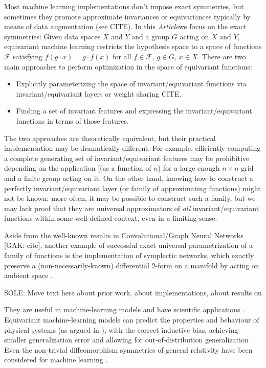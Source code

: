 \documentclass{article}
\theoremstyle{plain}
\theoremstyle{definition}
\theoremstyle{remark}
\newcommand{\documentname}{\textsl{Article}}
\begin{document}
Most machine learning implementations don't impose exact symmetries, but sometimes they promote approximate invariances or equivariances typically by means of data augmentation (see CITE). In this \documentname we focus on the exact symmetries: Given data spaces $X$ and $Y$ and a group $G$ acting on $X$ and $Y$, equivariant machine learning restricts the hypothesis space to a space of functions $\mathcal F$ satisfying  $f(g\cdot x) = g \cdot f(x)$ for all $f\in \mathcal F$, $g\in G$, $x\in X$. There are two main approaches to perform optimization in the space of equivariant functions:
\begin{itemize}
    \item Explicitly parameterizing the space of invariant/equivariant functions via invariant/equivariant layers or weight sharing CITE.
    \item Finding a set of invariant features and expressing the invariant/equivariant functions in terms of those features.
\end{itemize}

The two approaches are theoretically equivalent, but their practical implementation may be dramatically different. For example, efficiently computing a complete generating set of invariant/equivariant features may be prohibitive depending on the application [(as a function of $n$) for a large enough $n\times n$ grid  and a finite group acting on it. On the other hand, knowing how to construct a perfectly invariant/equivariant layer (or family of approximating functions) might not be known; more often, it may be possible to construct such a family, but we may lack proof that they are universal approximators of \textit{all} invariant/equivariant functions within some well-defined context, even in a limiting sense.

Aside from the well-known results in Convolutional/Graph Neural Networks [GAK: cite], another example of successful exact universal parametrization of a family of functions is the implementation of symplectic networks, which exactly preserve a (non-necessarily-known) differential 2-form on a manifold by acting on ambient space \cite{sympnets,henonnets}.

SOLE: Move text here about prior work, about implementations, about results on 

They are useful in machine-learning models \cite{cohen2016group, kondor2018convolution, thomas2018tensor, geiger2022e3nn, finzi2020generalizing, finzi2021practical} and have scientific applications \cite{batzner20223, musaelian2022learning, stark2022equibind, yu-physics, wang2022approximately}.
Equivariant machine-learning models can predict the properties and behaviour of physical systems (as argued in \citealt{cheng2019covariance}), with the correct inductive bias, achieving smaller generalization error \cite{bietti2021sample, elesedy2021provably, elesedy2021kernel, mei2021learning} and allowing for out-of-distribution generalization \cite{villar2022dimensionless}. 
Even the non-trivial diffeomorphism symmetries of general relativity have been considered for machine learning \cite{weiler}.
\end{document}
